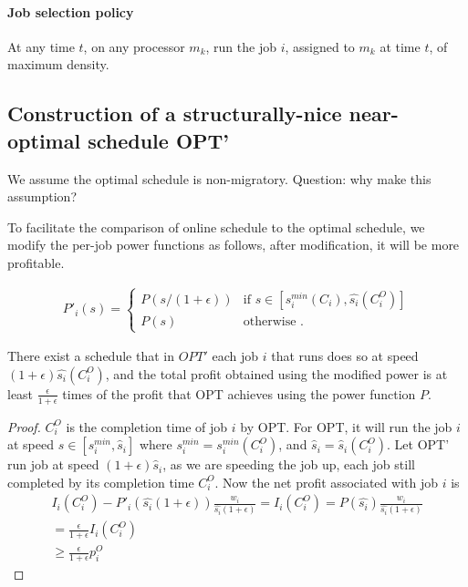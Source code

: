 \documentclass[10 pt,final]{article}
\newcommand{\question}[1]{{\color{blue} #1}}
\begin{document}
\paragraph{Job selection policy} At any time $t$, on any processor $m_k$, run the job $i$, assigned to $m_k$ at time $t$, of maximum density.

\subsection{Construction of a structurally-nice near-optimal schedule OPT'}
We assume the optimal schedule is non-migratory. \question{Question: why make this assumption?}

To facilitate the comparison of online schedule to the optimal schedule, we modify the per-job power functions as follows, after modification, it will be more profitable.

\begin{align}
P'_i(s) = 
\begin{cases} 
P(s/(1+\epsilon)) & \mbox{if } s \in [s^{min}_i(C_i), \hat{s_i}(C^O_i)] \\ 
P(s) & \mbox{otherwise } . 
\end{cases}
\label{eq_modify-speed}
\end{align}

\begin{lemma} There exist a schedule that in $OPT'$ each job $i$ that runs does so at speed $(1+\epsilon)\hat{s_i}(C^O_i)$, and the total profit obtained using the modified power is at least $\frac{\epsilon}{1+\epsilon}$ times of the profit that OPT achieves using the power function $P$. 
\end{lemma}

\begin{proof}
$C^O_i$ is the completion time of job $i$ by OPT.
For OPT, it will run the job $i$ at speed $s \in [s^{min}_i, \hat{s}_i]$ where $s^{min}_i = s^{min}_i(C^O_i)$, and $\hat{s}_i = \hat{s}_i(C^O_i)$. Let OPT' run job at speed $(1+\epsilon)\hat{s}_i$, as we are speeding the job up, each job still completed by its completion time $C^O_i$. Now the net profit associated with job $i$ is
\begin{align*}
I_i(C^O_i) - P'_i(\hat{s_i}(1+\epsilon)) \frac{w_i}{\hat{s_i}(1+\epsilon)} = I_i(C^O_i) = P(\hat{s_i})\frac{w_i}{\hat{s_i}(1+\epsilon)} \\
= \frac{\epsilon}{1+\epsilon} I_i(C^O_i) \\
\ge \frac{\epsilon}{1+\epsilon} p^O_i
\end{align*}
\end{proof}
\end{document}
